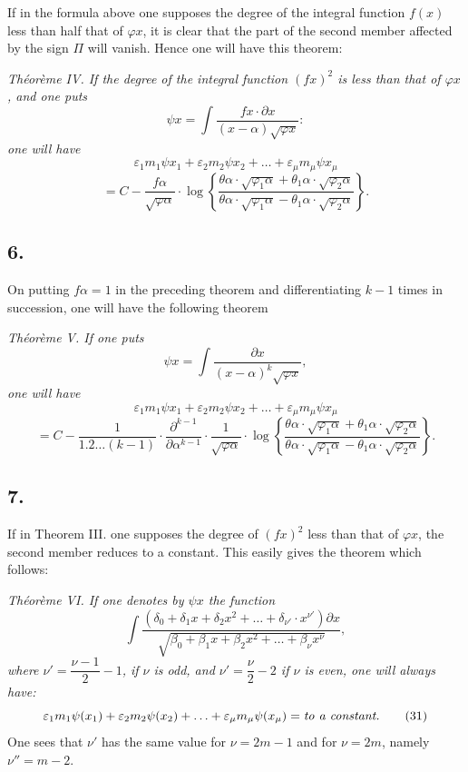 \documentclass{article}
\begin{document}
If in the formula above one supposes the degree of the integral function $f(x)$ less than half that of $\varphi x$, it is clear that the part of the second member affected by the sign $\Pi$ will vanish. Hence one will have this theorem:

\emph{Théorème IV. If the degree of the integral function $(fx)^{2}$ is less than that of $\varphi x$, and one puts}
\[ \psi x = \int \frac{fx \cdot \partial x}{(x-\alpha)\sqrt{\varphi x}}: \]
\emph{one will have}
\[ \varepsilon_1 m_1\psi x_1 + \varepsilon_2 m_2\psi x_2 + \ldots + \varepsilon_\mu m_\mu\psi x_\mu \tag{30} \]
\[ = C - \frac{f\alpha}{\sqrt{\varphi\alpha}} \cdot \log\left\{\frac{\theta\alpha \cdot \sqrt{\varphi_1\alpha}+\theta_1\alpha \cdot \sqrt{\varphi_2\alpha}}{\theta\alpha \cdot \sqrt{\varphi_1\alpha}-\theta_1\alpha \cdot \sqrt{\varphi_2\alpha}}\right\}. \]

\subsection*{6.}

On putting $f\alpha = 1$ in the preceding theorem and differentiating $k-1$ times in succession, one will have the following theorem

\emph{Théorème V. If one puts}
\[ \psi x = \int \frac{\partial x}{(x-\alpha)^{k}\sqrt{\varphi x}}, \]
\emph{one will have}
\[ \varepsilon_1 m_1\psi x_1 + \varepsilon_2 m_2\psi x_2 + \ldots + \varepsilon_\mu m_\mu\psi x_\mu \]
\[ = C - \frac{1}{1.2\ldots(k-1)} \cdot \frac{\partial^{k-1}}{\partial\alpha^{k-1}} \cdot \frac{1}{\sqrt{\varphi\alpha}} \cdot \log\left\{\frac{\theta\alpha \cdot \sqrt{\varphi_1\alpha}+\theta_1\alpha \cdot \sqrt{\varphi_2\alpha}}{\theta\alpha \cdot \sqrt{\varphi_1\alpha}-\theta_1\alpha \cdot \sqrt{\varphi_2\alpha}}\right\}. \]

\subsection*{7.}

If in Theorem III. one supposes the degree of $(fx)^{2}$ less than that of $\varphi x$, the second member reduces to a constant. This easily gives the theorem which follows:

\emph{Théorème VI. If one denotes by $\psi x$ the function}
\[ \int \frac{(\delta_0+\delta_1 x+\delta_2 x^{2}+\ldots+\delta_{\nu'} \cdot x^{\nu'})\partial x}{\sqrt{\beta_0+\beta_1 x+\beta_2 x^{2}+\ldots+\beta_\nu x^{\nu}}}, \]
\emph{where $\nu' = \dfrac{\nu-1}{2}-1$, if $\nu$ is odd, and $\nu' = \dfrac{\nu}{2}-2$ if $\nu$ is even, one will always have:}
\[ \varepsilon_1 m_1\psi(x_1) + \varepsilon_2 m_2\psi(x_2) + \ldots + \varepsilon_\mu m_\mu\psi(x_\mu) = \text{\textit{to a constant.}} \tag{31} \]
One sees that $\nu'$ has the same value for $\nu = 2m-1$ and for $\nu = 2m$, namely $\nu'' = m-2$.
\end{document}
